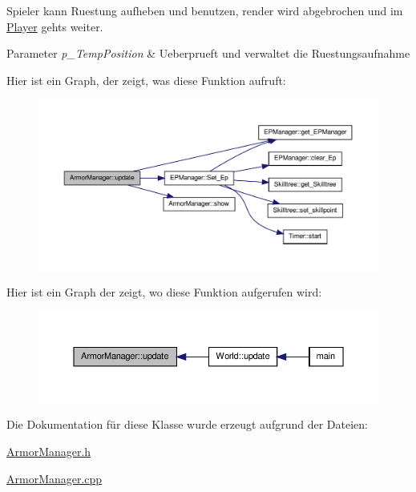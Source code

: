 Spieler kann Ruestung aufheben und benutzen, render wird abgebrochen und im \hyperlink{class_player}{Player} gehts weiter. 


\begin{DoxyParams}{Parameter}
{\em p\-\_\-\-Temp\-Position} & Ueberprueft und verwaltet die Ruestungsaufnahme \\
\hline
\end{DoxyParams}


Hier ist ein Graph, der zeigt, was diese Funktion aufruft\-:
\nopagebreak
\begin{figure}[H]
\begin{center}
\leavevmode
\includegraphics[width=350pt]{class_armor_manager_a6f608963c4a1efb31b2d658ee5246459_cgraph}
\end{center}
\end{figure}




Hier ist ein Graph der zeigt, wo diese Funktion aufgerufen wird\-:
\nopagebreak
\begin{figure}[H]
\begin{center}
\leavevmode
\includegraphics[width=350pt]{class_armor_manager_a6f608963c4a1efb31b2d658ee5246459_icgraph}
\end{center}
\end{figure}




Die Dokumentation für diese Klasse wurde erzeugt aufgrund der Dateien\-:\begin{DoxyCompactItemize}
\item 
\hyperlink{_armor_manager_8h}{Armor\-Manager.\-h}\item 
\hyperlink{_armor_manager_8cpp}{Armor\-Manager.\-cpp}\end{DoxyCompactItemize}
